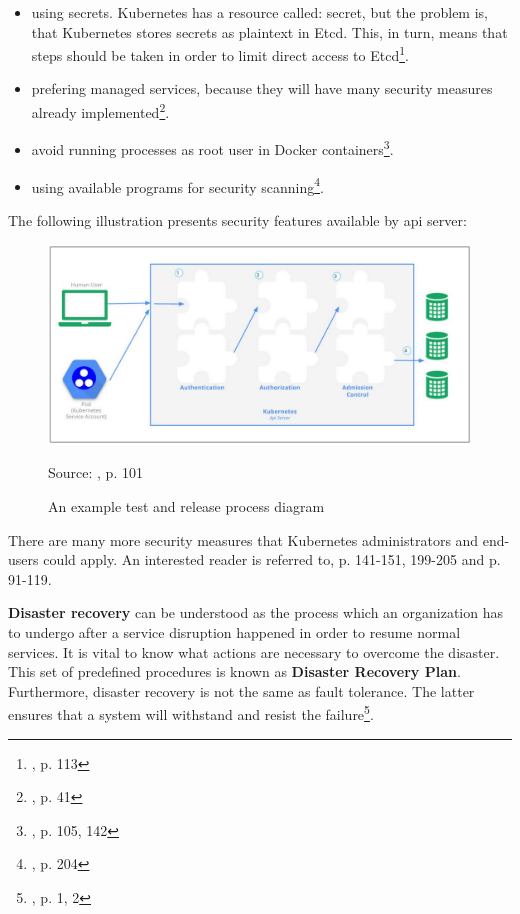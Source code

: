 {\begin{itemize}
\item using secrets. Kubernetes has a resource called: secret, but the problem is, that Kubernetes stores secrets as plaintext in Etcd. This, in turn, means that steps should be taken in order to limit direct access to Etcd\footnote{\cite{book-mastering-k8s}, p. 113}.
\item prefering managed services, because they will have many security measures already implemented\footnote{\cite{book-cndwk}, p. 41}.
\item avoid running processes as root user in Docker containers\footnote{\cite{book-cndwk}, p. 105, 142}.
\item using available programs for security scanning\footnote{\cite{book-cndwk}, p. 204}.
\end{itemize}

The following illustration presents security features available by api server:
\begin{figure}[H]
    \centering
    \includegraphics[width=13cm]{figures/security-api-server.png}
    \label{fig:security-api-server}
    \caption{An example test and release process diagram}
    \small{Source: \cite{book-mastering-k8s}, p. 101}
\end{figure}

There are many more security measures that Kubernetes administrators and end-users could apply. An interested reader is referred to\cite{book-cndwk}, p. 141-151, 199-205 and \cite{book-mastering-k8s} p. 91-119.

\textbf{Disaster recovery} can be understood as the process which an organization has to undergo after a service  disruption happened in order to resume normal services. It is vital to know what actions are necessary to overcome the disaster. This set of predefined procedures is known as \textbf{Disaster Recovery Plan}. Furthermore, disaster recovery is not the same as fault tolerance. The latter ensures that a system will withstand and resist the failure\footnote{\cite{article-dr}, p. 1, 2}.

}
